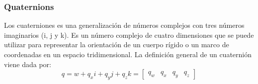 \begin{frame}

\end{frame}

\begin{frame}
    \frametitle{Quaternions}
    Los cuaterniones es una generalización de números complejos con tres números imaginarios (i, j y k). Es un número complejo de cuatro dimensiones que se puede utilizar para representar la orientación de un cuerpo rígido o un marco de coordenadas en un espacio tridimensional. La definición general de un cuaternión viene dada por:
    \begin{equation*}
        q = w + q_x i + q_y j + q_z k = \begin{bmatrix} q_w & q_x & q_y & q_z\end{bmatrix}
    \end{equation*}
\end{frame}

